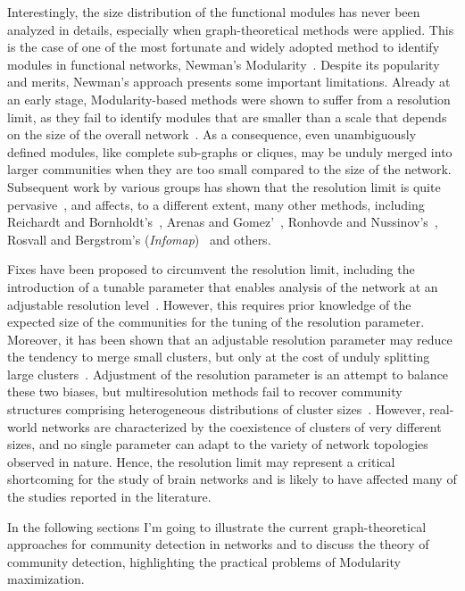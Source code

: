 Interestingly, the size distribution of the functional modules has never been analyzed in details, especially when graph-theoretical methods were applied.
This is the case of one of the most fortunate and widely adopted method to identify modules in functional networks, Newman's Modularity~\cite{newman2006}.
Despite its popularity and merits, Newman's approach presents some important limitations.
Already at an early stage, Modularity-based methods were shown to suffer from a resolution limit, as they fail to identify modules that are smaller than a scale that depends on the size of the overall network~\cite{fortunato2007}.
As a consequence, even unambiguously defined modules, like complete sub-graphs or cliques, may be unduly merged into larger communities when they are too small compared to the size of the network.
Subsequent work by various groups has shown that the resolution limit is quite pervasive~\cite{lancichinetti2009,traag2011,squartini2015,lancichinetti2011,kawamoto2015}, and affects, to a different extent, many other methods, including Reichardt and Bornholdt’s~\cite{reichardt2006}, Arenas and Gomez'~\cite{arenas2008}, Ronhovde and Nussinov's~\cite{ronhovde2009}, Rosvall and Bergstrom's (\emph{Infomap})~\cite{rosvall2008,kawamoto2015} and others.

Fixes have been proposed to circumvent the resolution limit, including the introduction of a tunable parameter that enables analysis of the network at an adjustable resolution level~\cite{reichardt2006,ronhovde2010,yeo2011}. However, this requires prior knowledge of the expected size of the communities for the tuning of the resolution parameter. Moreover, it has been shown that an  adjustable resolution parameter may reduce the tendency to merge small clusters, but only at the cost of unduly splitting large clusters~\cite{lancichinetti2011}. Adjustment of the resolution parameter is an attempt to balance these two biases, but multiresolution methods fail to recover community structures comprising heterogeneous distributions of cluster sizes~\cite{lancichinetti2011}. 
However, real-world networks are characterized by the coexistence of clusters of very different sizes, and no single parameter can adapt to the variety of network topologies observed in nature.
Hence, the resolution limit may represent a critical shortcoming for the study of brain networks and is likely to have affected many of the studies reported in the literature.

In the following sections I'm going to illustrate the current graph-theoretical approaches for community detection in networks and to discuss the theory of community detection, highlighting the practical problems of Modularity maximization.



